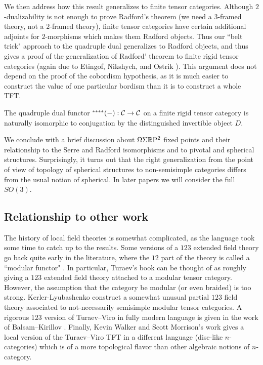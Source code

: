 \documentclass{amsart}
\begin{document}
We then address how this result generalizes to finite tensor categories.  Although $2$-dualizability is not enough to prove Radford's theorem  (we need a $3$-framed theory, not a $2$-framed theory), finite tensor categories have certain additional adjoints for $2$-morphisms which makes them Radford objects.  Thus our ``belt trick" approach to the quadruple dual generalizes to Radford objects, and thus gives a proof of the generalization of Radford' theorem to finite rigid tensor categories (again due to Etingof, Nikshych, and Ostrik \cite{MR2097289}).  This argument does not depend on the proof of the cobordism hypothesis, as it is much easier to construct the value of one particular bordism than it is to construct a whole TFT.

\begin{maincor} \label{cor8}
The quadruple dual functor ${}^{****}(-): \mathcal C \rightarrow \mathcal C$ on a finite rigid tensor category is naturally isomorphic to conjugation by the distinguished invertible object $D$.
\end{maincor}

We conclude with a brief discussion about $\Omega \Sigma \mathbb R \mathrm{P}^2$ fixed points and their relationship to the Serre and Radford isomorphisms and to pivotal and spherical structures.  Surprisingly, it turns out that the right generalization from the point of view of topology of spherical structures to non-semisimple categories differs from the usual notion of spherical.  In later papers we will consider the full $SO(3)$.


\subsection*{Relationship to other work}

The history of local field theories is somewhat complicated, as the language took some time to catch up to the results.  Some versions of a $123$ extended field theory go back quite early in the literature, where the $12$ part of the theory is called a ``modular functor" \cite{Segal, MR1002038, MR1159969,MR1797619}.  In particular, Turaev's book \cite{MR1292673} can be thought of as roughly giving a $123$ extended field theory attached to a modular tensor category.  However, the assumption that the category be modular (or even braided) is too strong.  Kerler-Lyubashenko \cite{MR1862634} construct a somewhat unusual partial $123$ field theory associated to not-necessarily semisimple modular tensor categories.   A rigorous $123$ version of Turaev--Viro in fully modern language is given in the work of Balsam--Kirillov \cite{1004.1533}.  Finally, Kevin Walker and Scott Morrison's work \cite{kw:tqft, 1009.5025} gives a local version of the Turaev--Viro TFT in a different language (disc-like $n$-categories) which is of a more topological flavor than other algebraic notions of $n$-category.
\end{document}
